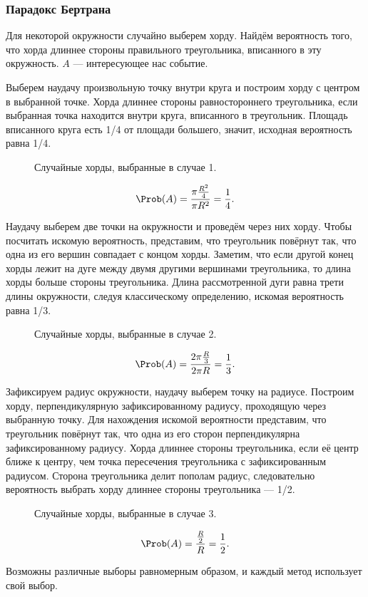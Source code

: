 \subsubsection{Парадокс Бертрана}
Для некоторой окружности случайно выберем хорду. Найдём вероятность того, что хорда длиннее стороны правильного треугольника, вписанного в эту окружность. $A$ --- интересующее нас событие.
\begin{description}[leftmargin=0cm]
\item[Метод «случайного центра».]
Выберем наудачу произвольную точку внутри круга и построим хорду с центром в выбранной точке. Хорда длиннее стороны равностороннего треугольника, если выбранная точка находится внутри круга, вписанного в треугольник. Площадь вписанного круга есть 1/4 от площади большего, значит, исходная вероятность равна 1/4.
\begin{figure}[ht]
  \centering
  \def\svgwidth{8em}
  
  \caption{Случайные хорды, выбранные в случае 1.}
\end{figure}
\[
  \Prob(A) = \frac{\pi \frac{R^2}{4}}{\pi R^2} = \frac{1}{4}.
\]
\item[Метод «случайных концов».] Наудачу выберем две точки на окружности и проведём через них хорду. Чтобы посчитать искомую вероятность, представим, что треугольник повёрнут так, что одна из его вершин совпадает с концом хорды. Заметим, что если другой конец хорды лежит на дуге между двумя другими вершинами треугольника, то длина хорды больше стороны треугольника. Длина рассмотренной дуги равна трети длины окружности, следуя классическому определению, искомая вероятность равна 1/3.
\begin{figure}[ht]
  \centering
  \def\svgwidth{8em}
  
  \caption{Случайные хорды, выбранные в случае 2.}
\end{figure}
\[
  \Prob(A) = \frac{2\pi \frac{R}{3}}{2 \pi R} = \frac{1}{3}.
\]
\item[Метод «случайного радиуса».] Зафиксируем радиус окружности, наудачу выберем точку на радиусе. Построим хорду, перпендикулярную зафиксированному радиусу, проходящую через выбранную точку. Для нахождения искомой вероятности представим, что треугольник повёрнут так, что одна из его сторон перпендикулярна зафиксированному радиусу. Хорда длиннее стороны треугольника, если её центр ближе к центру, чем точка пересечения треугольника с зафиксированным радиусом. Сторона треугольника делит пополам радиус, следовательно вероятность выбрать хорду длиннее стороны треугольника --- 1/2.
\begin{figure}[ht]
  \centering
  \def\svgwidth{8em}
  
  \caption{Случайные хорды, выбранные в случае 3.}
\end{figure}
\[ \Prob(A) = \frac{\frac{R}{2}}{R} = \frac{1}{2}. \]
\end{description}
Возможны различные выборы равномерным образом, и каждый метод использует свой выбор.
